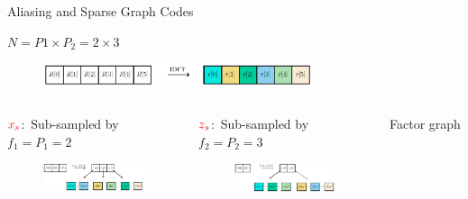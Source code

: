 \documentclass[10pt,xcolor=table]{beamer}
\begin{document}
	\begin{frame}{Aliasing and Sparse Graph Codes}
	
	\begin{block}{$N = P1 \times P_2 = 2 \times 3$}
		\begin{figure}[t]
			\centering
			\includegraphics[width=3.1in]{X_DFT}
		\end{figure}
	\end{block}
	
	\begin{columns}
		
		\begin{block}{{\small $\color{red}x_s$:\ Sub-sampled by $f_1=P_1=2$}}
			\begin{figure}[t]
				\centering
				\includegraphics[width=2.3in]{Xs_shift}
			\end{figure}
		\end{block}
		
		\begin{block}{{\small$\color{red}z_s$:\ Sub-sampled by $f_2=P_2=3$}}
			\begin{figure}[t]
				\centering
				\includegraphics[width=2.3in]{Zs_shift}
			\end{figure}
		\end{block}
		
		\begin{block}{\small Factor graph}
			
			\begin{figure}[t]
				\begin{center}
					\resizebox{1.0\textwidth}{!}{}
					\end{center}
				\end{figure}
		\end{block}
	\end{columns}
\end{frame}
	
\end{document}

